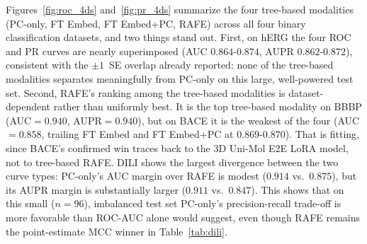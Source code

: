 \documentclass[pdflatex,sn-mathphys-num]{sn-jnl}%
\begin{document}
\begin{table}[!ht]
\centering
\caption{Best configurations on DILI (binary, drug-induced liver injury, TDC ADMET Group).}
\label{tab:dili}
\end{table}

Figures~\ref{fig:roc_4ds} and~\ref{fig:pr_4ds} summarize the four tree-based modalities (PC-only, FT Embed, FT Embed+PC, RAFE) across all four binary classification datasets, and two things stand out. First, on hERG the four ROC and PR curves are nearly superimposed (AUC $0.864$-$0.874$, AUPR $0.862$-$0.872$), consistent with the $\pm1$~SE overlap already reported: none of the tree-based modalities separates meaningfully from PC-only on this large, well-powered test set. Second, RAFE's ranking among the tree-based modalities is dataset-dependent rather than uniformly best. It is the top tree-based modality on BBBP (AUC$=0.940$, AUPR$=0.940$), but on BACE it is the weakest of the four (AUC$=0.858$, trailing FT Embed and FT Embed+PC at $0.869$-$0.870$). That is fitting, since BACE's confirmed win traces back to the 3D Uni-Mol E2E LoRA model, not to tree-based RAFE. DILI shows the largest divergence between the two curve types: PC-only's AUC margin over RAFE is modest ($0.914$ vs.\ $0.875$), but its AUPR margin is substantially larger ($0.911$ vs.\ $0.847$). This shows that on this small ($n=96$), imbalanced test set PC-only's precision-recall trade-off is more favorable than ROC-AUC alone would suggest, even though RAFE remains the point-estimate MCC winner in Table~\ref{tab:dili}.
\end{document}

